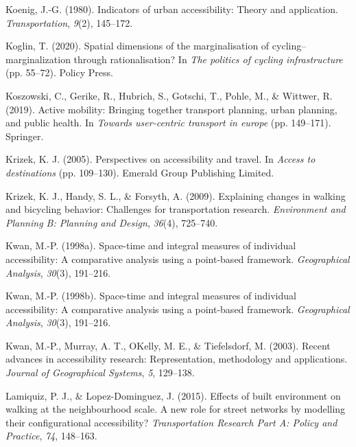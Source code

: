 \documentclass[12pt,twoside]{reedthesis}
\newlength{\cslhangindent}
\newenvironment{CSLReferences}[2] %
 {%
  \setlength{\parindent}{0pt}
  \ifodd #1 \everypar{\setlength{\hangindent}{\cslhangindent}}\ignorespaces\fi
  \ifnum #2 > 0
  \setlength{\parskip}{#2\baselineskip}
  \fi
 }%
 {}
\begin{document}
\begin{CSLReferences}{1}{0}
\leavevmode{}%
Koenig, J.-G. (1980). Indicators of urban accessibility: Theory and application. \emph{Transportation}, \emph{9}(2), 145--172.

\leavevmode{}%
Koglin, T. (2020). Spatial dimensions of the marginalisation of cycling--marginalization through rationalisation? In \emph{The politics of cycling infrastructure} (pp. 55--72). Policy Press.

\leavevmode{}%
Koszowski, C., Gerike, R., Hubrich, S., Gotschi, T., Pohle, M., \& Wittwer, R. (2019). Active mobility: Bringing together transport planning, urban planning, and public health. In \emph{Towards user-centric transport in europe} (pp. 149--171). Springer.

\leavevmode{}%
Krizek, K. J. (2005). Perspectives on accessibility and travel. In \emph{Access to destinations} (pp. 109--130). Emerald Group Publishing Limited.

\leavevmode{}%
Krizek, K. J., Handy, S. L., \& Forsyth, A. (2009). Explaining changes in walking and bicycling behavior: Challenges for transportation research. \emph{Environment and Planning B: Planning and Design}, \emph{36}(4), 725--740.

\leavevmode{}%
Kwan, M.-P. (1998a). Space-time and integral measures of individual accessibility: A comparative analysis using a point-based framework. \emph{Geographical Analysis}, \emph{30}(3), 191--216.

\leavevmode{}%
Kwan, M.-P. (1998b). Space-time and integral measures of individual accessibility: A comparative analysis using a point-based framework. \emph{Geographical Analysis}, \emph{30}(3), 191--216.

\leavevmode{}%
Kwan, M.-P., Murray, A. T., OKelly, M. E., \& Tiefelsdorf, M. (2003). Recent advances in accessibility research: Representation, methodology and applications. \emph{Journal of Geographical Systems}, \emph{5}, 129--138.

\leavevmode{}%
Lamiquiz, P. J., \& Lopez-Dominguez, J. (2015). Effects of built environment on walking at the neighbourhood scale. A new role for street networks by modelling their configurational accessibility? \emph{Transportation Research Part A: Policy and Practice}, \emph{74}, 148--163.


\end{CSLReferences}
\end{document}

